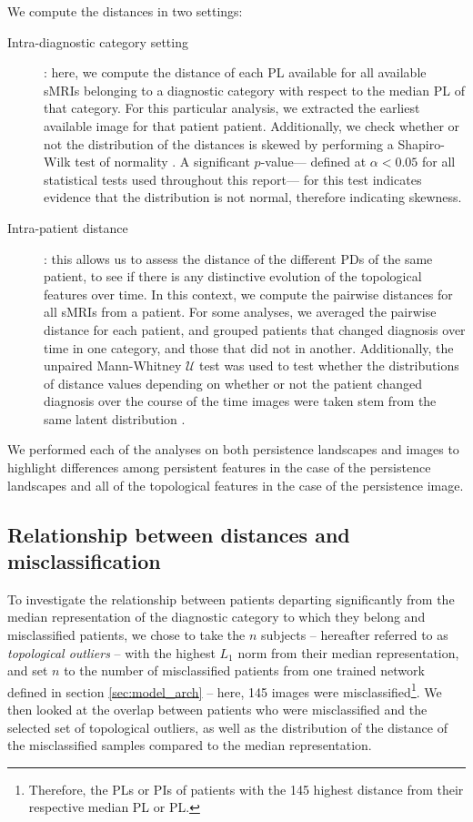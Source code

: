 \documentclass{article}
\begin{document}
We compute the distances in two settings:
\begin{description}
\item[Intra-diagnostic category setting]: here, we compute the distance of each PL available for all
available sMRIs belonging to a diagnostic category with respect to the median PL of that category.
For this particular analysis, we extracted the earliest available image for that patient patient.
Additionally, we check whether or not the distribution of the distances is skewed by performing a
Shapiro-Wilk test of normality \citep{shapiro1965analysis}. A significant $p$-value--- defined at
$\alpha<0.05$ for all statistical tests used throughout this report--- for this test indicates
evidence that the distribution is not normal, therefore indicating skewness.

\item[Intra-patient distance]: this allows us to assess the distance of the different PDs of the
same patient, to see if there is any distinctive evolution of the topological features over time. In
this context, we compute the pairwise distances for all sMRIs from a patient. For some analyses, we
averaged the pairwise distance for each patient, and grouped patients that changed diagnosis over
time in one category, and those that did not in another. Additionally, the unpaired Mann-Whitney
$\mathcal{U}$ test was used to test whether the distributions of distance values depending on
whether or not the patient changed diagnosis over the course of the time images were taken stem from
the same latent distribution \citep{mann1947test}.
\end{description}

We performed each of the analyses on both persistence landscapes and images to highlight differences
among persistent features in the case of the persistence landscapes and all of the topological
features in the case of the persistence image.

\subsection{Relationship between distances and misclassification}\label{sec:relationship_distance_misclassification}

To investigate the relationship between patients departing significantly from the median
representation of the diagnostic category to which they belong and misclassified patients, we chose
to take the $n$ subjects -- hereafter referred to as \emph{topological outliers} -- with the highest
$L_1$ norm from their median representation, and set $n$ to the number of misclassified patients
from one trained network defined in section \ref{sec:model_arch} -- here, 145 images were
misclassified\footnote{Therefore, the PLs or PIs of patients with the 145 highest distance from
their respective median PL or PL.}. We then looked at the overlap between patients who were
misclassified and the selected set of topological outliers, as well as the distribution of the
distance of the misclassified samples compared to the median representation.
\end{document}

